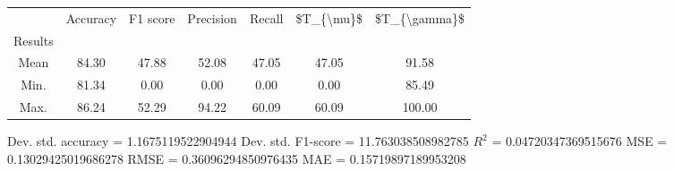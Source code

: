 \begin{tabular}{|c|c|c|c|c|c|c|}
\toprule
{} &  Accuracy &  F1 score &  Precision &  Recall &  \$T\_\{\textbackslash mu\}\$ &  \$T\_\{\textbackslash gamma\}\$ \\
Results &           &           &            &         &            &               \\
\hline
Mean    &     84.30 &     47.88 &      52.08 &   47.05 &      47.05 &         91.58 \\
Min.    &     81.34 &      0.00 &       0.00 &    0.00 &       0.00 &         85.49 \\
Max.    &     86.24 &     52.29 &      94.22 &   60.09 &      60.09 &        100.00 \\
\bottomrule
\end{tabular}

 Dev. std. accuracy = 1.1675119522904944
 Dev. std. F1-score = 11.763038508982785
 $R^2$ = 0.04720347369515676
 MSE = 0.13029425019686278
 RMSE = 0.36096294850976435
 MAE = 0.15719897189953208